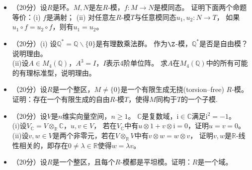 ~\\
\begin{center}
\end{center}
\begin{itemize}
\item[1.]（20分）设$R$是环。$M,N$是左$R$-模，$f:M \to N$是模同态。
证明下面两个命题等价：(i) $f$是满射；
(ii) 对任意左$R$-模$T$与任意模同态$u_1,u_2:N \to T$，
如果$u_1 \circ f= u_2 \circ f$，则有$u_1 = u_2$。

\item[2.]（20分）(i) 设$\mathbb{Q}^* = \mathbb{Q} \backslash \{0\}$是有理数乘法群。
作为$\Z$-模，$\mathbb{Q}^*$是否是自由模？说明理由。\\
(ii)设$A \in M_4(\mathbb{Q})$，$A^3 = I$，$I$表示$4$阶单位阵。
求$A$在$M_4(\mathbb{Q})$中的所有可能的有理标准型，说明理由。

\item[3.]（20分）设$R$是一个整区，$M\ne\{0\}$是一个有限生成无挠(torsion--free) $R$-模。
证明：存在一个有限生成的自由$R$-模$T$，使得$M$同构于$T$的一个子模.

\item[4.]（20分）设$V$是$n$维实向量空间，$n \ge 1$。
$\mathbb{C}$是复数域，$\mathrm{i} \in \mathbb{C}$满足$\mathrm{i}^2 = -1$。\\
(i)设$V_\mathbb{C}= V \otimes_\mathbb{R} \mathbb{C}$，$u,v \in V$，
若在$V_\mathbb{C}$中有$u \otimes 1 + v \otimes \mathrm{i} = 0$，证明$u = v = 0$。\\
(ii)设$v,w \in V$是两个非零元，若在$V \otimes_\mathbb{R} V$中有$v\otimes w = w \otimes v$，
证明$v,w$是$\mathbb{R}$-线性相关的，即存在$0\neq \lambda \in \mathbb{R}$使得$w = \lambda v$。

\item[5.]（20分）设$R$是一个整区，且每个$R$-模都是平坦模。证明：$R$是一个域。
\end{itemize}

